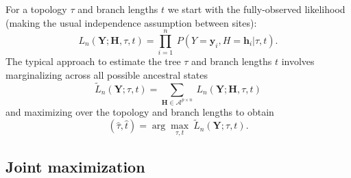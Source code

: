 \documentclass[a4paper]{article}
\newcommand{\alphabet}{\mathcal{A}}
\newcommand{\fullAlignment}{\mathbf{Y}}
\newcommand{\alignmentColumn}{\mathbf{y}}
\newcommand{\alignmentColumnRV}{Y}
\newcommand{\fullAncestralStates}{\mathbf{H}}
\newcommand{\ancestralStateColumn}{\mathbf{h}}
\newcommand{\ancestralStateColumnRV}{H}
\newcommand{\nCols}{n}
\newcommand{\nAncestralStateRows}{p}
\begin{document}
For a topology $\tau$ and branch lengths $t$ we start with the fully-observed likelihood (making the usual independence assumption between sites):
\begin{equation}
\label{eq:full_likelihood}
L_\nCols(\fullAlignment;\fullAncestralStates, \tau, t) = \prod_{i=1}^{\nCols} \ P(\alignmentColumnRV=\alignmentColumn_i, \ancestralStateColumnRV=\ancestralStateColumn_i | \tau, t).
\end{equation}
The typical approach to estimate the tree $\tau$ and branch lengths $t$ involves marginalizing across all possible ancestral states
\begin{equation}
\label{eq:marginal_likelihood}
\tilde{L}_\nCols(\fullAlignment; \tau, t) = \sum_{\fullAncestralStates\in\alphabet^{\nAncestralStateRows\times\nCols}} \ L_\nCols(\fullAlignment;\fullAncestralStates, \tau, t)
\end{equation}
and maximizing over the topology and branch lengths to obtain
$$
(\hat{\tau}, \hat{t}) = \arg\max_{\tau, t} \  \tilde{L}_\nCols(\fullAlignment; \tau, t).
$$

\subsection{Joint maximization}
\end{document}
